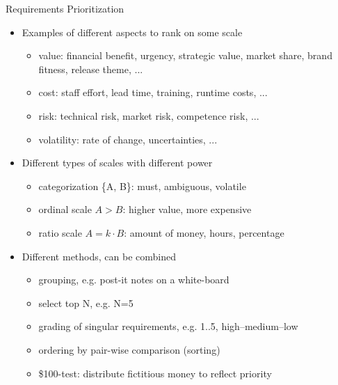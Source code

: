 \documentclass{beamer}
\begin{document}
\begin{frame}[fragile]{Requirements Prioritization}

\begin{itemize}
\item Examples of different aspects to rank on some scale
\begin{itemize}
  \item value: financial benefit, urgency, strategic value, market share, brand fitness, release theme, ...
  \item cost: staff effort, lead time, training, runtime costs, ... 
  \item risk: technical risk, market risk, competence risk, ...
  \item volatility: rate of change, uncertainties, ...
\end{itemize}
\item Different types of scales with different power
\begin{itemize}
  \item categorization \{A, B\}: must, ambiguous, volatile
  \item ordinal scale $A > B$: higher value, more expensive 
  \item ratio scale $A = k \cdot B$: amount of money, hours, percentage
\end{itemize}
\item Different methods, can be combined
\begin{itemize}
  \item grouping, e.g. post-it notes on a white-board
  \item select top N, e.g. N=5
  \item grading of singular requirements, e.g. 1..5, high--medium--low 
  \item ordering by pair-wise comparison (sorting)
  \item \$100-test: distribute fictitious money to reflect priority
\end{itemize}
\end{itemize}
\end{frame}
\end{document}
